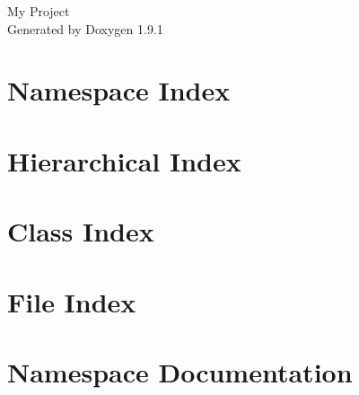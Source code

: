 \let\mypdfximage\pdfximage\def\pdfximage{\immediate\mypdfximage}\documentclass[twoside]{book}
\newcommand{\+}{\discretionary{\mbox{\scriptsize$\hookleftarrow$}}{}{}}
\newcommand{\clearemptydoublepage}{%
  \newpage{\pagestyle{empty}\cleardoublepage}%
}
\begin{document}
\raggedbottom

\hypersetup{pageanchor=false,
             bookmarksnumbered=true,
             pdfencoding=unicode
            }
\begin{titlepage}
\vspace*{7cm}
\begin{center}%
{\Large My Project }\\
\vspace*{1cm}
{\large Generated by Doxygen 1.9.1}\\
\end{center}
\end{titlepage}
\clearemptydoublepage
{}
\tableofcontents
\clearemptydoublepage
{}
\hypersetup{pageanchor=true}

\chapter{Namespace Index}

\chapter{Hierarchical Index}

\chapter{Class Index}

\chapter{File Index}

\chapter{Namespace Documentation}






\end{document}
